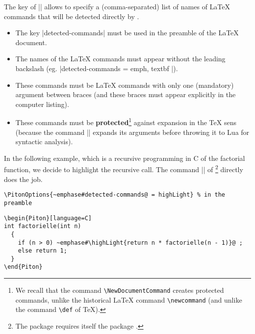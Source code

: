 \documentclass{article}
\begin{document}
\label{raw-detected-commands}
\label{vertical-detected-commands}
\label{detected-commands}

The key  of |\PitonOptions| allows to specify a
(comma-separated) list of names of LaTeX commands that will be detected 
directly by .

\begin{itemize}
\item The key |detected-commands| must be used in the preamble of the LaTeX document.

\item The names of the LaTeX commands must appear without the leading
backslash (eg. |detected-commands = { emph, textbf }|). 

\item These commands must be LaTeX commands with only one (mandatory) argument
between braces (and these braces must appear explicitly in the computer
listing). 

\item These commands must be \textbf{protected}\footnote{We recall that the
command \texttt{\textbackslash NewDocumentCommand} creates protected commands,
unlike the historical LaTeX command \texttt{\textbackslash newcommand} (and
unlike the command \texttt{\textbackslash def} of TeX).} against expansion in
the TeX sens (because the command |\piton| expands its arguments before
throwing it to Lua for syntactic analysis).
\end{itemize}

\bigskip
In the following example, which is a recursive programming in C of the
factorial function, we decide to highlight the recursive call. The command
|\highLight| of \footnote{The package  requires itself
the package .} directly does the job.

\medskip
\begin{footnotesize}
\begin{Verbatim}
\PitonOptions{~emphase#detected-commands@ = highLight} % in the preamble
\end{Verbatim}
\end{footnotesize}

\begin{Verbatim}
\begin{Piton}[language=C]
int factorielle(int n)
  {
    if (n > 0) ~emphase#\highLight{return n * factorielle(n - 1)}@ ;
    else return 1;
  }
\end{Piton}
\end{Verbatim}
\end{document}
